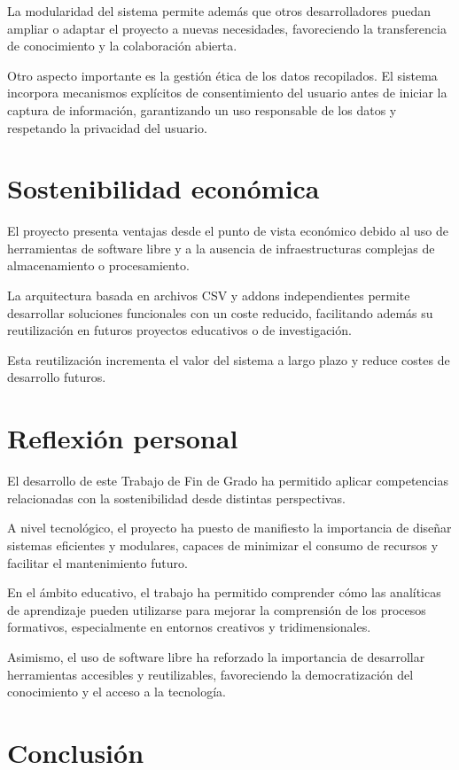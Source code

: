La modularidad del sistema permite además que otros desarrolladores puedan ampliar o adaptar el proyecto a nuevas necesidades, favoreciendo la transferencia de conocimiento y la colaboración abierta.

Otro aspecto importante es la gestión ética de los datos recopilados. El sistema incorpora mecanismos explícitos de consentimiento del usuario antes de iniciar la captura de información, garantizando un uso responsable de los datos y respetando la privacidad del usuario.

\section{Sostenibilidad económica}

El proyecto presenta ventajas desde el punto de vista económico debido al uso de herramientas de software libre y a la ausencia de infraestructuras complejas de almacenamiento o procesamiento.

La arquitectura basada en archivos CSV y addons independientes permite desarrollar soluciones funcionales con un coste reducido, facilitando además su reutilización en futuros proyectos educativos o de investigación.

Esta reutilización incrementa el valor del sistema a largo plazo y reduce costes de desarrollo futuros.

\section{Reflexión personal}

El desarrollo de este Trabajo de Fin de Grado ha permitido aplicar competencias relacionadas con la sostenibilidad desde distintas perspectivas.

A nivel tecnológico, el proyecto ha puesto de manifiesto la importancia de diseñar sistemas eficientes y modulares, capaces de minimizar el consumo de recursos y facilitar el mantenimiento futuro.

En el ámbito educativo, el trabajo ha permitido comprender cómo las analíticas de aprendizaje pueden utilizarse para mejorar la comprensión de los procesos formativos, especialmente en entornos creativos y tridimensionales.

Asimismo, el uso de software libre ha reforzado la importancia de desarrollar herramientas accesibles y reutilizables, favoreciendo la democratización del conocimiento y el acceso a la tecnología.

\section{Conclusión}

